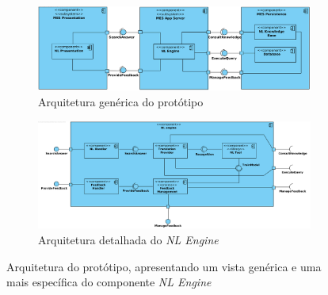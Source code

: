 \begin{figure}[!h]
\centering
    \begin{subfigure}{\textwidth}
         \centering
         \includegraphics[width=\textwidth]{ch04/assets/architecture.png}
         \caption{Arquitetura genérica do protótipo}
         \label{fig:generic_architecture}
     \end{subfigure}
     \bigbreak
     \bigbreak
     \begin{subfigure}{\textwidth}
         \centering
         \includegraphics[width=\textwidth]{ch04/assets/nl-engine.png}
         \caption{Arquitetura detalhada do \textit{NL Engine}}
         \label{fig:nlengine_architecture}
     \end{subfigure}
\caption{Arquitetura do protótipo, apresentando um vista genérica e uma mais específica do componente \textit{NL Engine}}
\label{fig:prototype_architecture}
\end{figure}

